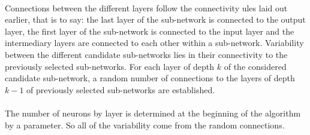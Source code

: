 \documentclass[11 pt]{article}
\begin{document}
\paragraph{}Connections between the different layers follow the connectivity ules laid out earlier, that is to say: the last layer of the sub-network is connected to the output layer, the first layer of the sub-network is connected to the input layer and the intermediary layers are connected to each other within a sub-network. Variability between the different candidate sub-networks lies in their connectivity to the previously selected sub-networks. For each layer of depth \(k\) of the considered candidate sub-network, a random number of connections to the layers of depth \(k-1\) of previously selected sub-networks are established.

\paragraph{}The number of neurons by layer is determined at the beginning of the algorithm by a parameter. So all of the variability come from the random connections.

\end{document}
